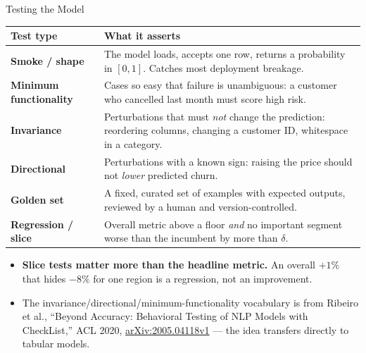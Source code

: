 
\begin{frame}{Testing the Model}

    \centering
    \renewcommand{\arraystretch}{1.3}
    {\scriptsize
    \begin{tabular}{p{3.0cm}|p{8.4cm}}
        \toprule
        \textbf{Test type} & \textbf{What it asserts} \\
        \midrule
        \textbf{Smoke / shape}   & The model loads, accepts one row, returns a probability in $[0,1]$. Catches
                                   most deployment breakage. \\
        \textbf{Minimum functionality} & Cases so easy that failure is unambiguous: a customer who cancelled
                                   last month must score high risk. \\
        \textbf{Invariance}      & Perturbations that must \emph{not} change the prediction: reordering
                                   columns, changing a customer ID, whitespace in a category. \\
        \textbf{Directional}     & Perturbations with a known sign: raising the price should not \emph{lower}
                                   predicted churn. \\
        \textbf{Golden set}      & A fixed, curated set of examples with expected outputs, reviewed by a human
                                   and version-controlled. \\
        \textbf{Regression / slice} & Overall metric above a floor \emph{and} no important segment worse than
                                   the incumbent by more than $\delta$. \\
        \bottomrule
    \end{tabular}}

    \vspace{0.21em}
    \begin{itemize}
        \scriptsize
        \item \textbf{Slice tests matter more than the headline metric.} An overall $+1\%$ that hides
              $-8\%$ for one region is a regression, not an improvement.
        \item {\scriptsize The invariance/directional/minimum-functionality vocabulary is from Ribeiro et al.,
              ``Beyond Accuracy: Behavioral Testing of NLP Models with CheckList,'' ACL 2020,
              \href{https://arxiv.org/abs/2005.04118v1}{arXiv:2005.04118v1} --- the idea transfers directly to
              tabular models.}
    \end{itemize}

\end{frame}
